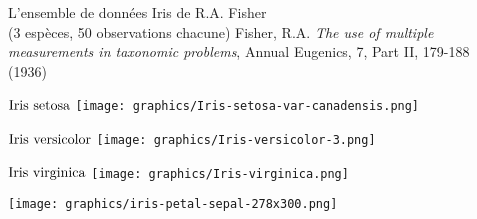 


\begin{frame}{\Large \vskip -0.5cm L'ensemble de donn\'ees Iris de R.A. Fisher\\ \small(3 esp\`eces, 50 observations chacune)
\vskip -0.1cm{\tiny Fisher, R.A. \textit{The use of multiple measurements in taxonomic problems}, Annual Eugenics, 7, Part II, 179-188 (1936)}
}

\small

\begin{multicols}{2}

	\begin{flushleft}
	\begin{minipage}{4.5cm}
	\vskip -0.2cm
	\begin{center}
	$\textnormal{Iris setosa}$
	\vskip 0.05cm
	\texttt{[image: graphics/Iris-setosa-var-canadensis.png]}
	\end{center}
	\end{minipage}
	\end{flushleft}

\columnbreak

	\begin{flushright}
	\begin{minipage}{4.5cm}
	\vskip -0.2cm
	\begin{center}
	$\textnormal{Iris versicolor}$
	\vskip 0.05cm
	\texttt{[image: graphics/Iris-versicolor-3.png]}
	\end{center}
	\end{minipage}
	\end{flushright}

\end{multicols}

\begin{multicols}{2}

	\begin{flushleft}
	\begin{minipage}{4.5cm}
	\begin{center}
	$\textnormal{Iris virginica}$
	\vskip 0.05cm
	\texttt{[image: graphics/Iris-virginica.png]}
	\end{center}
	\end{minipage}
	\end{flushleft}

\columnbreak

	\begin{flushright}
	\begin{minipage}{4.5cm}
	\begin{center}
	\texttt{[image: graphics/iris-petal-sepal-278x300.png]}
	\end{center}
	\end{minipage}
	\end{flushright}

\end{multicols}

\end{frame}
\normalsize

